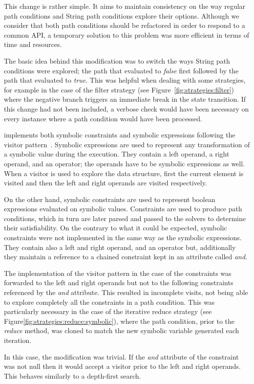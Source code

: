 
This change is rather simple. It aims to maintain consistency on the way regular path conditions and String path conditions explore their options. Although we consider that both path conditions should be refactored in order to respond to a common API, a temporary solution to this problem was more efficient in terms of time and resources.

The basic idea behind this modification was to switch the ways String path conditions were explored; the path that evaluated to \textit{false} first followed by the path that evaluated to \textit{true}. This was helpful when dealing with some strategies, for example in the case of the filter strategy (see Figure~\ref{fig:strategies:filter}) where the negative branch triggers an immediate break in the state transition. If this change had not been included, a verbose check would have been necessary on every instance where a path condition would have been processed.


\spf{} implements both symbolic constraints and symbolic expressions following the visitor pattern~\cite{Gamma1994}. Symbolic expressions are used to represent any transformation of a symbolic value during the execution. They contain a left operand, a right operand, and an operator; the operands have to be symbolic expressions as well. When a visitor is used to explore the data structure, first the current element is visited and then the left and right operands are visited respectively. 

On the other hand, symbolic constraints are used to represent boolean expressions evaluated on symbolic values. Constraints are used to produce path conditions, which in turn are later parsed and passed to the solvers to determine their satisfiability. On the contrary to what it could be expected, symbolic constraints were not implemented in the same way as the symbolic expressions. They contain also a left and right operand, and an operator but, additionally they maintain a reference to a chained constraint kept in an attribute called \textit{and}.

The implementation of the visitor pattern in the case of the constraints was forwarded to the left and right operands but not to the following constraints referenced by the \textit{and} attribute. This resulted in incomplete visits, not being able to explore completely all the constraints in a path condition. This was particularly necessary in the case of the iterative reduce strategy (see Figure\ref{fig:strategies:reduce:symbolic}), where the path condition, prior to the \textit{reduce} method, was cloned to match the new symbolic variable generated each iteration.

In this case, the modification was trivial. If the \textit{and} attribute of the constraint was not null then it would accept a visitor prior to the left and right operands. This behaves similarly to a depth-first search.